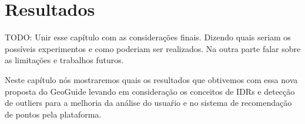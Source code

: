 \chapter{Resultados}

TODO: Unir esse capítulo com as considerações finais. Dizendo quais seriam os possíveis experimentos e como poderiam ser realizados. Na outra parte falar sobre as limitações e trabalhos futuros.

Neste capítulo nós mostraremos quais os resultados que obtivemos com essa nova proposta do GeoGuide levando em consideração os conceitos de IDRs e detecção de outliers para a melhoria da análise do usuaŕio e no sistema de recomendação de pontos pela plataforma.